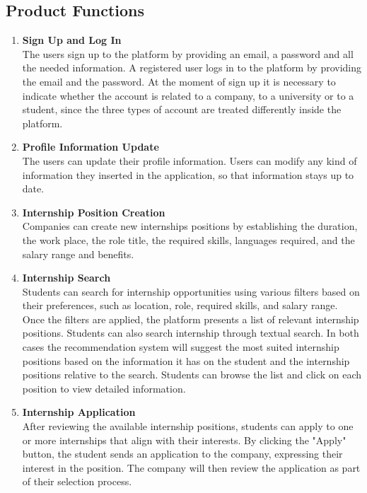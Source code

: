 \newpage
\subsection{Product Functions}
    \begin{enumerate}
        \item \textbf {Sign Up and Log In}             
        \\ The users sign up to the platform by providing an email, a password and all the needed information. A registered user logs in to the platform by providing the email and the password. At the moment of sign up it is necessary to indicate whether the account is related to a company, to a university or to a student, since the three types of account are treated differently inside the platform.
        
        \item \textbf {Profile Information Update}   
        \\ The users can update their profile information. Users can modify any kind of information they inserted in the application, so that information stays up to date.
        
        \item \textbf {Internship Position Creation}
        \\ Companies can create new internships positions by establishing the duration, the work place, the role title, the required skills, languages required, and the salary range and benefits.

        \item \textbf{Internship Search}
        \\ Students can search for internship opportunities using various filters based on their preferences, such as location, role, required skills, and salary range. Once the filters are applied, the platform presents a list of relevant internship positions. Students can also search internship through textual search. In both cases the recommendation system will suggest the most suited internship positions based on the information it has on the student and the internship positions relative to the search. Students can browse the list and click on each position to view detailed information.

        \item \textbf{Internship Application}
        \\ After reviewing the available internship positions, students can apply to one or more internships that align with their interests. By clicking the "Apply" button, the student sends an application to the company, expressing their interest in the position. The company will then review the application as part of their selection process.
        

\end{enumerate}
